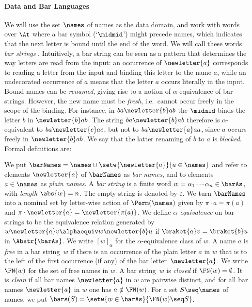 \documentclass[10pt, final, conference, a4paper, twocolumn]{IEEEtran}
\renewcommand{\enquote}[1]{`#1'}
\begin{document}
\paragraph*{Data and Bar Languages}

We will use the set $\names$ of names as the data domain, and work with words over $\At$ where a bar symbol (\enquote{$\midmid$}) might precede names, which indicates that the next letter is bound until the end of the word.
We will call these words \emph{bar strings} \cite{skmw17}.
Intuitively, a bar string can be seen as a pattern that determines the way letters are read from the input: an occurrence of $\newletter{a}$ corresponds to reading a letter from the input and binding this letter to the name $a$, while an undecorated occurrence of $a$ means that the letter $a$ occurs literally in the input.
Bound names can be \emph{renamed}, giving rise to a notion of $\alpha$-equivalence of bar strings.
However, the new name must be \emph{fresh}, i.e.~cannot occur freely in the scope of the binding.
For instance, in $ba\newletter{b}ab$ the $\midmid$ binds the letter $b$ in $\newletter{b}ab$.
The string $ba\newletter{b}ab$ therefore is $\alpha$-equivalent to $ba\newletter{c}ac$, but not to $ba\newletter{a}aa$, since $a$ occurs freely in $\newletter{b}ab$.
We say that the latter renaming of $b$ to $a$ is \emph{blocked}.
Formal definitions are:%

\begin{defn}
  We put $\barNames = \names \cup \setw{\newletter{a}}{a \in \names}$ and refer to elements $\newletter{a}$ of $\barNames$ as \emph{bar names}, and to elements $a \in \names$ as \emph{plain names}.
  A \emph{bar string} is a finite word $w = \alpha_1 \cdots \alpha_n \in \barAs$, with \emph{length} $\abs{w} = n$.
  The empty string is denoted by $\varepsilon$.
  We turn $\barNames$ into a nominal set by letter-wise action of $\Perm(\names)$ given by $\pi \cdot a = \pi(a)$ and $\pi \cdot \newletter{a} = \newletter{\pi(a)}$.
  We define \emph{$\alpha$-equivalence} on bar strings to be the equivalence relation generated by $w\newletter{a}v \alphaequiv w\newletter{b}u$ if $\braket{a}v = \braket{b}u$ in $\Abstr{\barAs}$.
  We write $[w]_\alpha$ for the $\alpha$-equivalence class of $w$.
  A name $a$ is \emph{free} in a bar string~$w$ if there is an occurrence of the plain letter $a$ in $w$ that is to the left of the first occurrence (if any) of the bar letter~$\newletter{a}$.
  We write $\FN(w)$ for the set of free names in $w$.
  A bar string~$w$ is \emph{closed} if $\FN(w) = \emptyset$.
  It is \emph{clean} if all bar names $\newletter{a}$ in $w$ are pairwise
    distinct, and for all bar names $\newletter{a}$ in $w$ one has $a \notin \FN(w)$. For a set $S \seq \names$ of names, we put $\bars(S) =
    \setw{w \in \barAs}{\FN(w) \seq S}$.
\end{defn}
\end{document}
